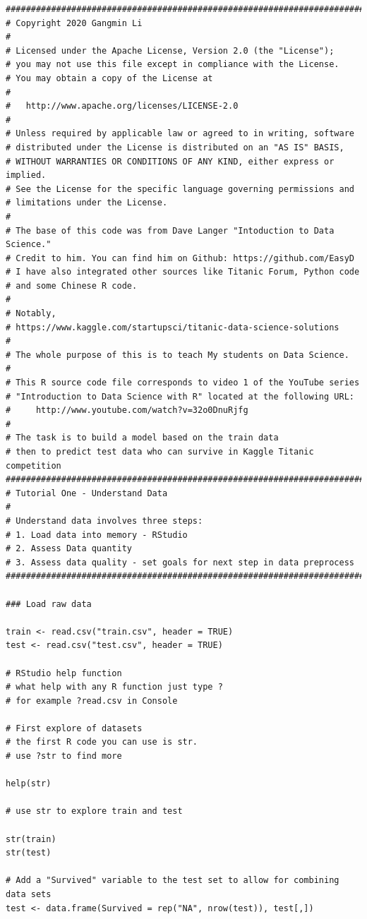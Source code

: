 \documentclass[
]{book}
\begin{document}
\begin{verbatim}
############################################################################
# Copyright 2020 Gangmin Li
#
# Licensed under the Apache License, Version 2.0 (the "License");
# you may not use this file except in compliance with the License.
# You may obtain a copy of the License at
#
#  	http://www.apache.org/licenses/LICENSE-2.0
#
# Unless required by applicable law or agreed to in writing, software
# distributed under the License is distributed on an "AS IS" BASIS,
# WITHOUT WARRANTIES OR CONDITIONS OF ANY KIND, either express or implied.
# See the License for the specific language governing permissions and
# limitations under the License.
#
# The base of this code was from Dave Langer "Intoduction to Data Science."
# Credit to him. You can find him on Github: https://github.com/EasyD
# I have also integrated other sources like Titanic Forum, Python code
# and some Chinese R code.
#
# Notably,
# https://www.kaggle.com/startupsci/titanic-data-science-solutions
#
# The whole purpose of this is to teach My students on Data Science.
#
# This R source code file corresponds to video 1 of the YouTube series
# "Introduction to Data Science with R" located at the following URL:
#     http://www.youtube.com/watch?v=32o0DnuRjfg
#
# The task is to build a model based on the train data
# then to predict test data who can survive in Kaggle Titanic competition
##########################################################################
# Tutorial One - Understand Data
#
# Understand data involves three steps:
# 1. Load data into memory - RStudio
# 2. Assess Data quantity
# 3. Assess data quality - set goals for next step in data preprocess
##########################################################################

### Load raw data

train <- read.csv("train.csv", header = TRUE)
test <- read.csv("test.csv", header = TRUE)

# RStudio help function
# what help with any R function just type ?
# for example ?read.csv in Console

# First explore of datasets
# the first R code you can use is str.
# use ?str to find more

help(str)

# use str to explore train and test

str(train)
str(test)

# Add a "Survived" variable to the test set to allow for combining data sets
test <- data.frame(Survived = rep("NA", nrow(test)), test[,])


\end{verbatim}
\end{document}
